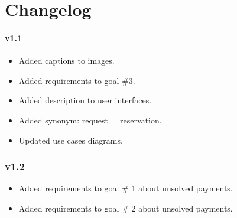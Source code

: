 \chapter*{Changelog}
\subsubsection{v1.1}
\begin{itemize}
\item Added captions to images.
\item Added requirements to goal \#3.
\item Added description to user interfaces.
\item Added synonym: request = reservation.
\item Updated use cases diagrams.
\end{itemize}

\subsection{v1.2}
\begin{itemize}
\item Added requirements to goal \# 1 about unsolved payments.
\item Added requirements to goal \# 2 about unsolved payments.
\end{itemize}
